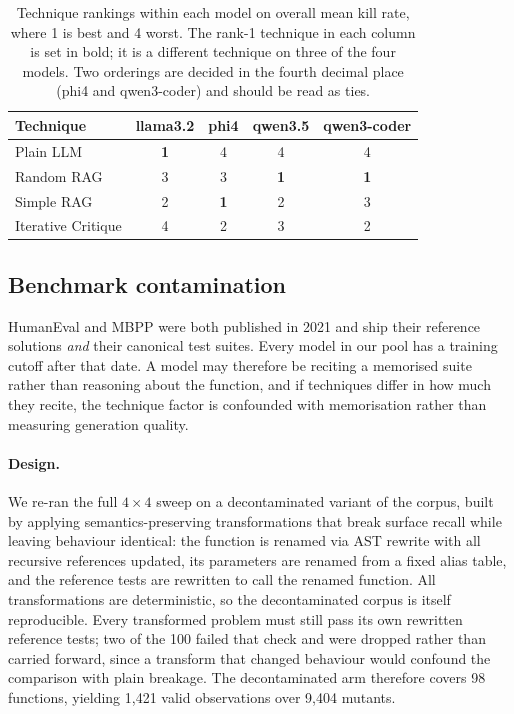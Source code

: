 \documentclass[smallextended]{svjour3}
\begin{document}
\begin{table}[t]
\centering
\caption{Technique rankings within each model on overall mean kill
rate, where 1 is best and 4 worst. The rank-1 technique in each
column is set in bold; it is a different technique on three of the
four models. Two orderings are decided in the fourth decimal place
(phi4 and qwen3-coder) and should be read as ties.}\label{tab:rank-table}
\begin{tabular}{@{}lcccc@{}}
\toprule
Technique & llama3.2 & phi4 & qwen3.5 & qwen3-coder \\
\midrule
Plain LLM & \textbf{1} & 4 & 4 & 4 \\
Random RAG & 3 & 3 & \textbf{1} & \textbf{1} \\
Simple RAG & 2 & \textbf{1} & 2 & 3 \\
Iterative Critique & 4 & 2 & 3 & 2 \\
\bottomrule
\end{tabular}
\end{table}

\subsection{Benchmark contamination}\label{sec:results-contamination}

HumanEval and MBPP were both published in 2021 and ship their
reference solutions \emph{and} their canonical test suites. Every
model in our pool has a training cutoff after that date. A model may
therefore be reciting a memorised suite rather than reasoning about
the function, and if techniques differ in how much they recite, the
technique factor is confounded with memorisation rather than
measuring generation quality.

\paragraph{Design.} We re-ran the full $4 \times 4$ sweep on a
decontaminated variant of the corpus, built by applying
semantics-preserving transformations that break surface recall while
leaving behaviour identical: the function is renamed via AST rewrite
with all recursive references updated, its parameters are renamed
from a fixed alias table, and the reference tests are rewritten to
call the renamed function. All transformations are deterministic, so
the decontaminated corpus is itself reproducible. Every transformed
problem must still pass its own rewritten reference tests; two of the
100 failed that check and were dropped rather than carried forward,
since a transform that changed behaviour would confound the
comparison with plain breakage. The decontaminated arm therefore
covers 98 functions, yielding 1{,}421 valid observations over
9{,}404 mutants.
\end{document}
